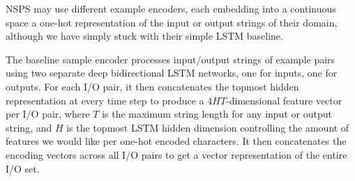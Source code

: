 \documentclass{article} %
\begin{document}
NSPS may use different example encoders,
each embedding into a continuous space a one-hot representation of the input or output strings of their domain,
although we have simply stuck with their simple LSTM baseline.

The baseline sample encoder processes input/output strings of example pairs
using two separate deep bidirectional LSTM networks,
one for inputs, one for outputs.
For each I/O pair, it then concatenates the topmost hidden representation
at every time step to produce a $4HT$-dimensional feature vector per I/O pair,
where $T$ is the maximum string length for any input or output string,
and $H$ is the topmost LSTM hidden dimension controlling the amount
of features we would like per one-hot encoded characters.
It then concatenates the encoding vectors across all I/O pairs
to get a vector representation of the entire I/O set.~\citep{nsps}
\end{document}
